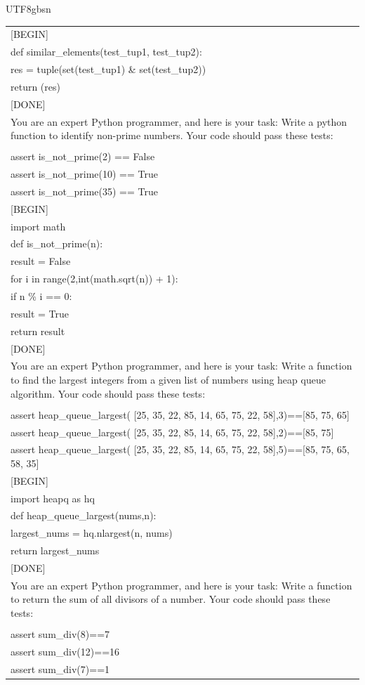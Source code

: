 \documentclass[11pt, a4paper, logo, copyright, nonumbering]{deepseek}
\begin{document}
\begin{CJK*}{UTF8}{gbsn}
\begin{table}[ht]
\begin{tabular}{p{12cm}}
[BEGIN]\\
def similar\_elements(test\_tup1, test\_tup2):\\
  res = tuple(set(test\_tup1) \& set(test\_tup2))\\
  return (res) \\

[DONE]\\
You are an expert Python programmer, and here is your task: Write a python function to identify non-prime numbers. Your code should pass these tests:\\
\\
assert is\_not\_prime(2) == False\\
assert is\_not\_prime(10) == True\\
assert is\_not\_prime(35) == True\\

[BEGIN]\\
import math\\
def is\_not\_prime(n):\\
    result = False\\
    for i in range(2,int(math.sqrt(n)) + 1):\\
        if n \% i == 0:\\
            result = True\\
    return result\\

[DONE]\\
You are an expert Python programmer, and here is your task: Write a function to find the largest integers from a given list of numbers using heap queue algorithm. Your code should pass these tests:\\
\\
assert heap\_queue\_largest( [25, 35, 22, 85, 14, 65, 75, 22, 58],3)==[85, 75, 65] \\
assert heap\_queue\_largest( [25, 35, 22, 85, 14, 65, 75, 22, 58],2)==[85, 75] \\
assert heap\_queue\_largest( [25, 35, 22, 85, 14, 65, 75, 22, 58],5)==[85, 75, 65, 58, 35]\\

[BEGIN]\\
import heapq as hq\\
def heap\_queue\_largest(nums,n):\\
  largest\_nums = hq.nlargest(n, nums)\\
  return largest\_nums\\

[DONE]\\
You are an expert Python programmer, and here is your task: Write a function to return the sum of all divisors of a number. Your code should pass these tests:\\
\\
assert sum\_div(8)==7\\
assert sum\_div(12)==16\\
assert sum\_div(7)==1\\


\end{tabular}
\end{table}
\end{CJK*}
\end{document}
